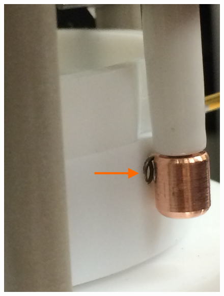 
\begin{figure}[htbp]
\begin{center}
\includegraphics[width=\halffig]{figures/testbed/ft2_1.jpg}

\end{center}
\end{figure}
